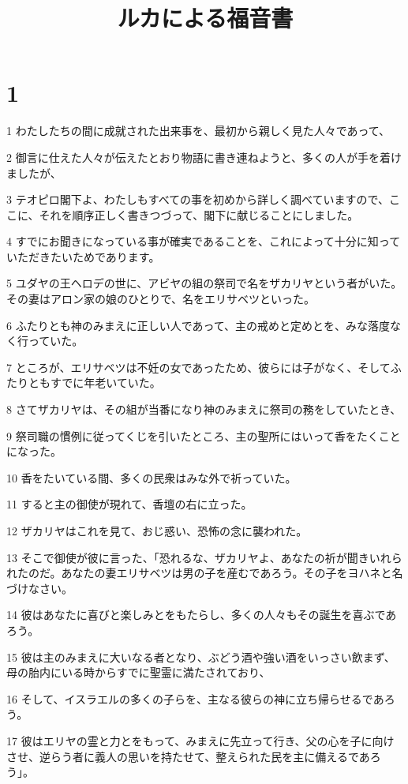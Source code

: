 

\title{ルカによる福音書}


\chapter{1}

\par 1 わたしたちの間に成就された出来事を、最初から親しく見た人々であって、
\par 2 御言に仕えた人々が伝えたとおり物語に書き連ねようと、多くの人が手を着けましたが、
\par 3 テオピロ閣下よ、わたしもすべての事を初めから詳しく調べていますので、ここに、それを順序正しく書きつづって、閣下に献じることにしました。
\par 4 すでにお聞きになっている事が確実であることを、これによって十分に知っていただきたいためであります。
\par 5 ユダヤの王ヘロデの世に、アビヤの組の祭司で名をザカリヤという者がいた。その妻はアロン家の娘のひとりで、名をエリサベツといった。
\par 6 ふたりとも神のみまえに正しい人であって、主の戒めと定めとを、みな落度なく行っていた。
\par 7 ところが、エリサベツは不妊の女であったため、彼らには子がなく、そしてふたりともすでに年老いていた。
\par 8 さてザカリヤは、その組が当番になり神のみまえに祭司の務をしていたとき、
\par 9 祭司職の慣例に従ってくじを引いたところ、主の聖所にはいって香をたくことになった。
\par 10 香をたいている間、多くの民衆はみな外で祈っていた。
\par 11 すると主の御使が現れて、香壇の右に立った。
\par 12 ザカリヤはこれを見て、おじ惑い、恐怖の念に襲われた。
\par 13 そこで御使が彼に言った、「恐れるな、ザカリヤよ、あなたの祈が聞きいれられたのだ。あなたの妻エリサベツは男の子を産むであろう。その子をヨハネと名づけなさい。
\par 14 彼はあなたに喜びと楽しみとをもたらし、多くの人々もその誕生を喜ぶであろう。
\par 15 彼は主のみまえに大いなる者となり、ぶどう酒や強い酒をいっさい飲まず、母の胎内にいる時からすでに聖霊に満たされており、
\par 16 そして、イスラエルの多くの子らを、主なる彼らの神に立ち帰らせるであろう。
\par 17 彼はエリヤの霊と力とをもって、みまえに先立って行き、父の心を子に向けさせ、逆らう者に義人の思いを持たせて、整えられた民を主に備えるであろう」。
